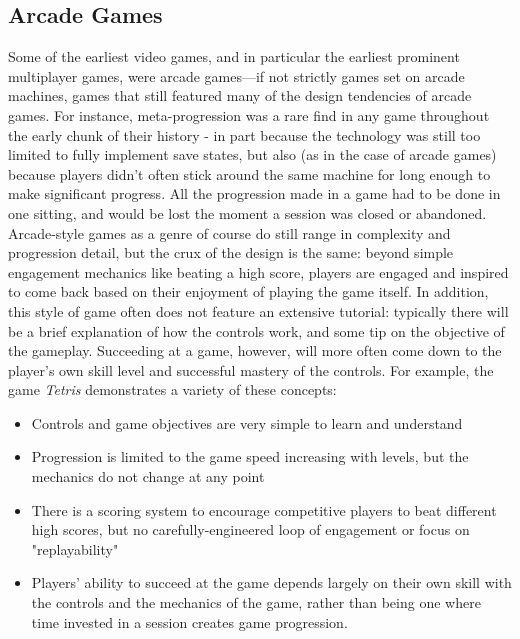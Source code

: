 \documentclass[10pt,twocolumn]{article}
\begin{document}
\subsection{Arcade Games}
Some of the earliest video games, and in particular the earliest prominent multiplayer games, were arcade games—if not strictly games set on arcade machines, games that still featured many of the design tendencies of arcade games. For instance, meta-progression was a rare find in any game throughout the early chunk of their history - in part because the technology was still too limited to fully implement save states, but also (as in the case of arcade games) because players didn't often stick around the same machine for long enough to make significant progress. \cite{arcades} All the progression made in a game had to be done in one sitting, and would be lost the moment a session was closed or abandoned. Arcade-style games as a genre of course do still range in complexity and progression detail, but the crux of the design is the same: beyond simple engagement mechanics like beating a high score, players are engaged and inspired to come back based on their enjoyment of playing the game itself. In addition, this style of game often does not feature an extensive tutorial: typically there will be a brief explanation of how the controls work, and some tip on the objective of the gameplay. Succeeding at a game, however, will more often come down to the player's own skill level and successful mastery of the controls. For example, the game \textit{Tetris} demonstrates a variety of these concepts:
\begin{itemize}
    \item Controls and game objectives are very simple to learn and understand
    \item Progression is limited to the game speed increasing with levels, but the mechanics do not change at any point
    \item There is a scoring system to encourage competitive players to beat different high scores, but no carefully-engineered loop of engagement or focus on "replayability"
    \item Players' ability to succeed at the game depends largely on their own skill with the controls and the mechanics of the game, rather than being one where time invested in a session creates game progression.
\end{itemize}
\end{document}
